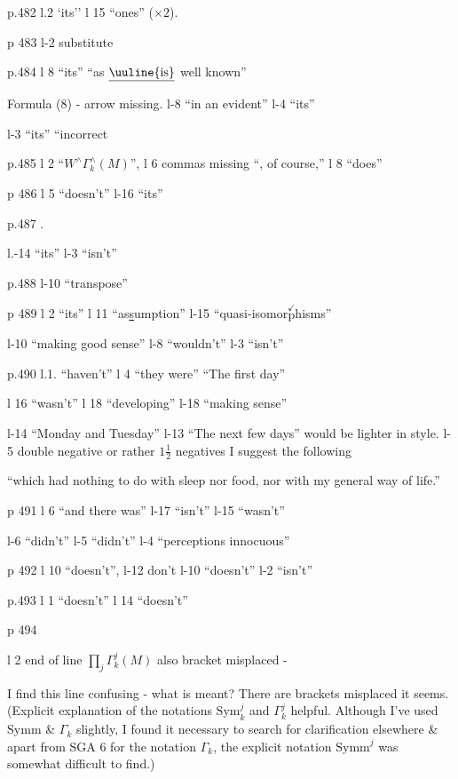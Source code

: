 p.482 l.2 `its'' \quad l 15 ``ones'' ($\times 2$).

p 483 l-2 substitute

p.484 l 8 ``its'' \quad ``as $\underline{\text{\uuline{is}}}$ well known''

Formula (8) - arrow missing. \quad l-8 ``in an evident'' \quad l-4 ``its''

l-3 ``its'' \quad ``incorrect

p.485 l 2 ``$W^{\wedge}\Gamma_{k}^{\wedge}(M)$'', \quad l 6 commas missing ``, of course,'' \quad l 8 ``does''

p 486 l 5 ``doesn't'' \quad l-16 ``its''

p.487 .

l.-14 ``its'' \quad l-3 ``isn't''

p.488 l-10 ``transpose''

p 489 l 2 ``its'' \quad l 11 ``as\uline{s}umption'' \quad l-15 ``quasi-isomor$\overset{\checkmark}{\text{p}}$hisms''

l-10 ``making good sense'' \quad l-8 ``wouldn't'' \quad l-3 ``isn't''

p.490 l.1. ``haven't'' \quad l 4 ``they were'' \quad ``The first day''

l 16 ``wasn't'' \quad l 18 ``developing'' \quad l-18 ``making sense''

l-14 ``Monday and Tuesday'' \quad l-13 ``The next few days'' would be lighter in style. \quad l-5 double negative or rather $1\frac{1}{2}$ negatives I suggest the following

``which had nothing to do with sleep nor food, nor with my general way of life.''

p 491 l 6 ``and there was'' \quad l-17 ``isn't'' \quad l-15 ``wasn't''

l-6 ``didn't'' \quad l-5 ``didn't'' \quad l-4 ``perceptions innocuous''

p 492 l 10 ``doesn't'', \quad l-12 don't \quad l-10 ``doesn't'' \quad l-2 ``isn't''

p.493 l 1 ``doesn't'' \quad l 14 ``doesn't''

p 494 

l 2 end of line $\prod\limits_{j}\Gamma_{k}^{j}(M)$ \quad also bracket misplaced -

\unsure{---} I find this line confusing - what is meant? There are brackets misplaced it seems. (Explicit explanation of the notations $\mathrm{Sym}_{k}^{j}$ and $\Gamma_{k}^{j}$   helpful. Although I've used $\mathrm{Symm}$ \& $\Gamma_{k}$\deleted{\unsure{,}} slightly, I  found  it necessary to search for clarification elsewhere \& apart from SGA 6 for the notation $\Gamma_{k}$, the explicit notation \deleted{\unsure{$\Gamma$}} $\mathrm{Symm}^{j}$ was somewhat difficult to find.)

